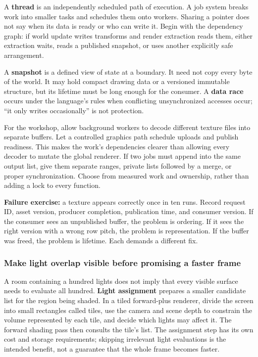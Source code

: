 A \textbf{thread} is an independently scheduled path of execution. A job system breaks work into smaller tasks and schedules them onto workers. Sharing a pointer does not say when its data is ready or who can write it. Begin with the dependency graph: if world update writes transforms and render extraction reads them, either extraction waits, reads a published snapshot, or uses another explicitly safe arrangement.

A \textbf{snapshot} is a defined view of state at a boundary. It need not copy every byte of the world. It may hold compact drawing data or a versioned immutable structure, but its lifetime must be long enough for the consumer. A \textbf{data race} occurs under the language's rules when conflicting unsynchronized accesses occur; ``it only writes occasionally'' is not protection.

For the workshop, allow background workers to decode different texture files into separate buffers. Let a controlled graphics path schedule uploads and publish readiness. This makes the work's dependencies clearer than allowing every decoder to mutate the global renderer. If two jobs must append into the same output list, give them separate ranges, private lists followed by a merge, or proper synchronization. Choose from measured work and ownership, rather than adding a lock to every function.

\textbf{Failure exercise:} a texture appears correctly once in ten runs. Record request ID, asset version, producer completion, publication time, and consumer version. If the consumer sees an unpublished buffer, the problem is ordering. If it sees the right version with a wrong row pitch, the problem is representation. If the buffer was freed, the problem is lifetime. Each demands a different fix.

\subsubsection{Make light overlap visible before promising a faster frame}\label{06-engine-ii-ch026-make-light-overlap-visible-before-promising-a-faster-frame}

\hypertarget{06-engine-ii-ch026-make-light-overlap-visible-before-promising-a-faster-frame}{}

A room containing a hundred lights does not imply that every visible surface needs to evaluate all hundred. \textbf{Light assignment} prepares a smaller candidate list for the region being shaded. In a tiled forward-plus renderer, divide the screen into small rectangles called tiles, use the camera and scene depth to constrain the volume represented by each tile, and decide which lights may affect it. The forward shading pass then consults the tile's list. The assignment step has its own cost and storage requirements; skipping irrelevant light evaluations is the intended benefit, not a guarantee that the whole frame becomes faster.

